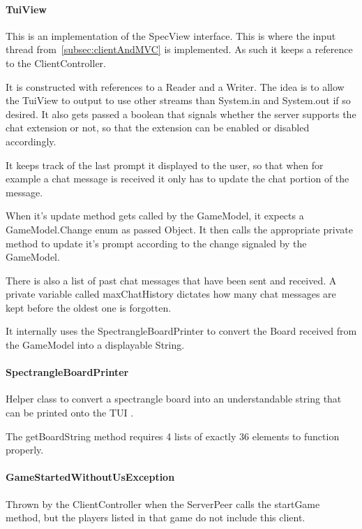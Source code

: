 \documentclass[12pt, letterpaper]{article}
\begin{document}
    \paragraph{TuiView}
    This is an implementation of the SpecView interface.
    This is where the input thread from~\autoref{subsec:clientAndMVC} is implemented.
    As such it keeps a reference to the ClientController.

    It is constructed with references to a Reader and a Writer.
    The idea is to allow the TuiView to output to use other streams than System.in and System.out if so desired.
    It also gets passed a boolean that signals whether the server supports the chat extension or not,
    so that the extension can be enabled or disabled accordingly.

    It keeps track of the last prompt it displayed to the user, so that when for example a chat message is received
    it only has to update the chat portion of the message.

    When it's update method gets called by the GameModel, it expects a GameModel.Change enum as passed Object.
    It then calls the appropriate private method to update it's prompt according to the change signaled by the
    GameModel.

    There is also a list of past chat messages that have been sent and received.
    A private variable called maxChatHistory dictates how many chat messages are
    kept before the oldest one is forgotten.

    It internally uses the SpectrangleBoardPrinter to convert the Board received from the GameModel into a displayable
    String.

    \paragraph{SpectrangleBoardPrinter}
    Helper class to convert a spectrangle board into an understandable string that can be printed onto the TUI .

    The getBoardString method requires 4 lists of exactly 36 elements to function properly.

    \paragraph{GameStartedWithoutUsException}
    Thrown by the ClientController when the ServerPeer calls the startGame method, but the
    players listed in that game do not include this client.
\end{document}

